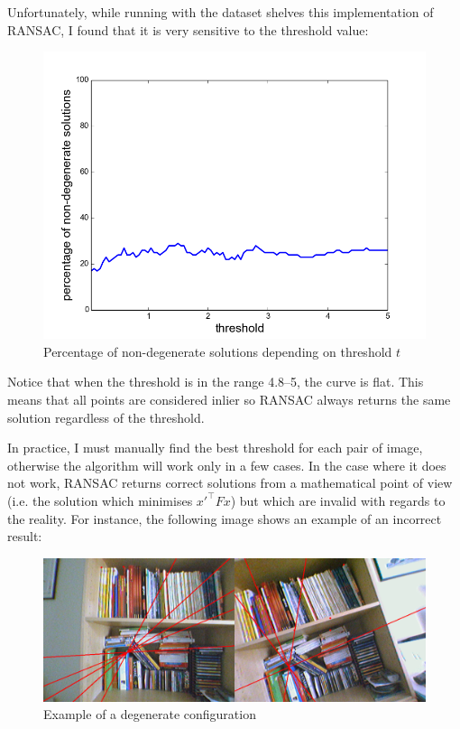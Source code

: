 \documentclass[11pt]{report}
\begin{document}
Unfortunately, while running with the dataset shelves this implementation of RANSAC, I found that it is very sensitive to the threshold value:

\begin{figure}[H]
	\centering
	\includegraphics[scale=0.7]{images/ransac-t.png}
    \caption{Percentage of non-degenerate solutions depending on threshold $t$}
    \label{fig:ransac-treshold}
\end{figure}

Notice that when the threshold is in the range 4.8--5, the curve is flat. This means that all points are considered inlier so RANSAC always returns the same solution regardless of the threshold.

In practice, I must manually find the best threshold for each pair of image, otherwise the algorithm will work only in a few cases. In the case where it does not work, RANSAC returns correct solutions from a mathematical point of view (i.e. the solution which minimises $x'^\top Fx$) but which are invalid with regards to the reality. For instance, the following image shows an example of an incorrect result:

\begin{figure}[H]
\includegraphics[scale=0.3]{images/degenerate.png}
\caption{Example of a degenerate configuration}
\end{figure}
\end{document}
